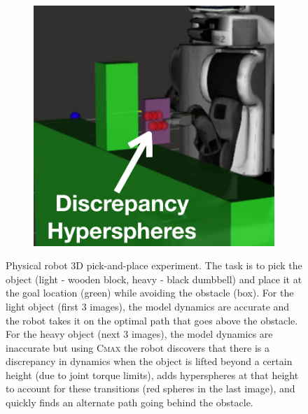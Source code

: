 \begin{figure}[t]
\begin{subfigure}{0.13\linewidth}
  \end{subfigure}
  \begin{subfigure}{0.13\linewidth}
    \includegraphics[width=\linewidth]{figures/cmax/pr2_pick_place_rviz_cropped_annotated.jpeg}
  \end{subfigure}
  \caption{Physical robot 3D pick-and-place experiment. The task is to
    pick the object (light - wooden block, heavy - black dumbbell) and
    place it at the goal location (green) while avoiding the obstacle
    (box). For the light object (first 3 images), the model dynamics are accurate and
    the robot takes it on the optimal path that goes above the
    obstacle. For the heavy object (next 3 images), the model dynamics are
    inaccurate but using \textsc{Cmax} the robot discovers that there
    is a discrepancy in dynamics when the object is lifted beyond a
    certain height (due to joint torque limits), adds hyperspheres at
    that height to
    account for these transitions (red spheres in the last image), and quickly finds an
    alternate path going behind the obstacle.}
  \label{fig:real-3d}
  
\end{figure}

